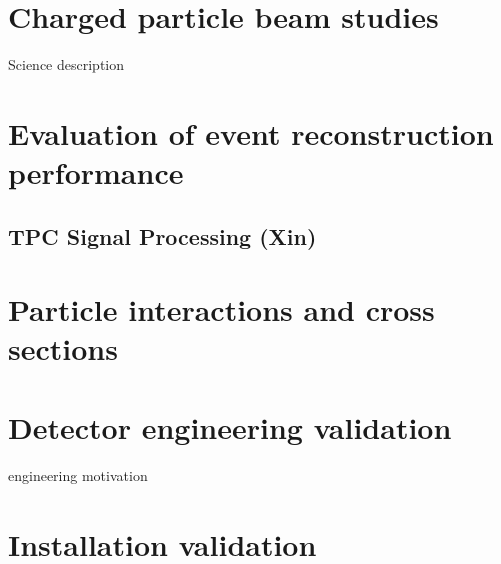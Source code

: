 
\section{Charged particle beam studies}
Science description


\section{Evaluation of event reconstruction performance}

\subsection{TPC Signal Processing (Xin)}

\section{Particle interactions and cross sections}

\section{Detector engineering validation}
engineering motivation

\section{Installation validation}




